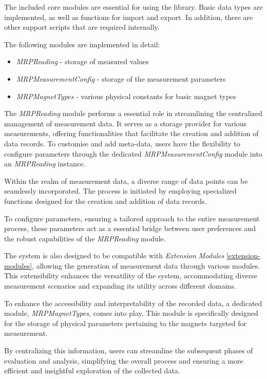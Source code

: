 The included core modules are essential for using the library. Basic
data types are implemented, as well as functions for import and export.
In addition, there are other support scripts that are required
internally.

The following modules are implemented in detail:

\begin{itemize}
\tightlist
\item
  \emph{MRPReading} - storage of measured values
\item
  \emph{MRPMeasurementConfig} - storage of the measurement parameters
\item
  \emph{MRPMagnetTypes} - various physical constants for basic magnet
  types
\end{itemize}

The \emph{MRPReading} module performs a essential role in streamlining
the centralized management of measurement data. It serves as a storage
provider for various measurements, offering functionalities that
facilitate the creation and addition of data records. To customise and
add meta-data, users have the flexibility to configure parameters
through the dedicated \emph{MRPMeasurementConfig} module into an
\emph{MRPReading} instance.

Within the realm of measurement data, a diverse range of data points can
be seamlessly incorporated. The process is initiated by employing
specialized functions designed for the creation and addition of data
records.

To configure parameters, ensuring a tailored approach to the entire
measurement process, these parameters act as a essential bridge between
user preferences and the robust capabilities of the \emph{MRPReading}
module.

The system is also designed to be compatible with \emph{Extension
Modules} \ref{extension-modules}, allowing the generation of measurement
data through various modules. This extensibility enhances the
versatility of the system, accommodating diverse measurement scenarios
and expanding its utility across different domains.

To enhance the accessibility and interpretability of the recorded data,
a dedicated module, \emph{MRPMagnetTypes}, comes into play. This module
is specifically designed for the storage of physical parameters
pertaining to the magnets targeted for measurement.

By centralizing this information, users can streamline the subsequent
phases of evaluation and analysis, simplifying the overall process and
ensuring a more efficient and insightful exploration of the collected
data.

